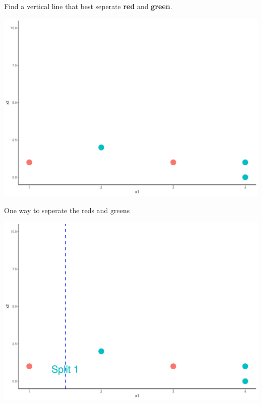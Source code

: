 \documentclass[
  ignorenonframetext,
]{beamer}
\begin{document}
\begin{frame}{Find a vertical line that best seperate \textbf{red} and
\textbf{green}.}
\protect\hypertarget{find-a-vertical-line-that-best-seperate-red-and-green.}{}

\includegraphics{fa_classification_tree_files/figure-beamer/unnamed-chunk-1-1.pdf}

\end{frame}

\begin{frame}{One way to seperate the reds and greens}
\protect\hypertarget{one-way-to-seperate-the-reds-and-greens}{}

\includegraphics{fa_classification_tree_files/figure-beamer/unnamed-chunk-2-1.pdf}

\end{frame}
\end{document}

